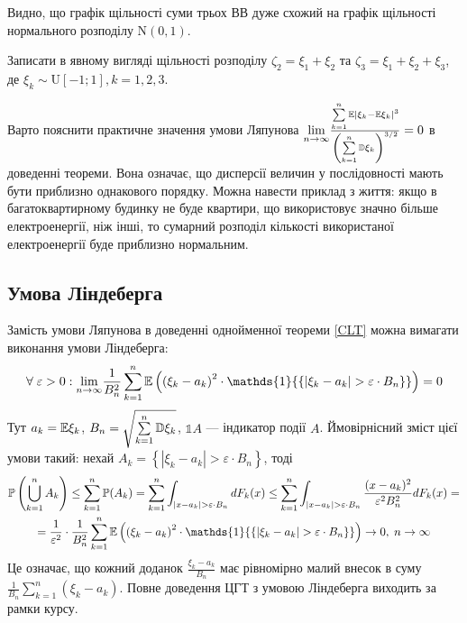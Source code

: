 Видно, що графік щільності суми трьох ВВ дуже схожий на графік щільності нормального розподілу $\mathrm{N}\left(0, 1\right)$.
\begin{exercise}
    Записати в явному вигляді щільності розподілу $\zeta_2 = \xi_1 + \xi_2$ та $\zeta_3 = \xi_1 + \xi_2 + \xi_3$, де
    $\xi_k \sim \mathrm{U}[-1; 1], k = 1,2,3$.
\end{exercise}
Варто пояснити практичне значення умови Ляпунова $\underset{n \rightarrow \infty}{\lim} \frac{\sum\limits_{k=1}^n \mathbb{E}\left| \xi_k - \mathbb{E}\xi_k\right|^3}{\left(
    \sum\limits_{k=1}^n \mathbb{D}\xi_k
\right)^{3/2}} = 0$ в доведенні теореми. Вона означає, що дисперсії величин у послідовності мають бути приблизно однакового порядку. 
Можна навести приклад з життя: якщо в багатоквартирному будинку не буде квартири, що використовує значно більше електроенергії, ніж інші,
то сумарний розподіл кількості використаної електроенергії буде приблизно нормальним.

\subsection{Умова Ліндеберга}
    Замість умови Ляпунова в доведенні однойменної теореми \ref{CLT} можна вимагати виконання умови Ліндеберга:
    $$\forall \; \varepsilon > 0 : \underset{n\to\infty}{\lim} 
    \frac{1}{B_n^2}\sum\limits_{k=1}^n \E \left( \left( \xi_k - a_k\right)^2 \cdot \mathds{1}{\left\{|\xi_k - a_k| > \varepsilon \cdot B_n\right\}}\right) = 0$$
    Тут $a_k = \mathbb{E}\xi_k$, $B_n = \sqrt{\sum\limits_{k=1}^n \mathbb{D}\xi_k}$, $\mathds{1} A$ --- індикатор події $A$.
    Ймовірнісний зміст цієї умови такий: нехай $A_k = \left\{ \left|\xi_k - a_k \right| > \varepsilon \cdot B_n \right\}$, тоді
    \begin{gather*}
        \P \left( \bigcup\limits_{k=1}^n A_k\right) \leq \sum\limits_{k=1}^n \P(A_k) = \sum\limits_{k=1}^n \int_{|x-a_k| > \varepsilon \cdot B_n} dF_k(x) \leq
    \sum\limits_{k=1}^n \int_{|x-a_k| > \varepsilon \cdot B_n} \frac{(x-a_k)^2}{\varepsilon^2 B_n^2} dF_k(x) = \\
    = \frac{1}{\varepsilon^2} \cdot \frac{1}{B_n^2}\sum\limits_{k=1}^n \E \left( \left( \xi_k - a_k\right)^2 \cdot \mathds{1}{\left\{|\xi_k - a_k| > \varepsilon \cdot B_n\right\}}\right) 
    \to 0, \; n\to\infty
    \end{gather*}
    Це означає, що кожний доданок $\frac{\xi_k - a_k}{B_n}$ має рівномірно малий внесок в суму $\frac{1}{B_n}\sum\limits_{k=1}^n (\xi_k - a_k)$.
Повне доведення ЦГТ з умовою Ліндеберга виходить за рамки курсу.
